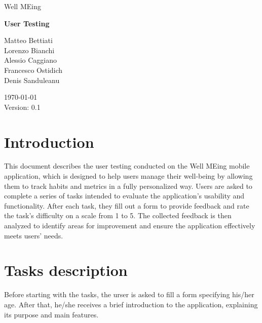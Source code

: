 \documentclass{article}
\begin{document}


\begin{center}

	\fontsize{20pt}{30pt}\selectfont
	Well MEing

	\vspace{2cm}

	\fontsize{25pt}{45pt}\selectfont
	\textbf{User Testing}

	\vfill

	\fontsize{12pt}{18pt}\selectfont
	Matteo Bettiati \\
	Lorenzo Bianchi \\
	Alessio Caggiano \\
	Francesco Ostidich \\
	Denis Sanduleanu \\

	\vspace{1cm}

	\today \\
	\vspace{12pt}
	Version: 0.1
	\normalsize

\end{center}

\newpage
{}
\tableofcontents
\newpage



\section{Introduction}
This document describes the user testing conducted on the Well MEing mobile application, which is designed to help users manage their well-being by allowing them to track habits and metrics in a fully personalized way.
Users are asked to complete a series of tasks intended to evaluate the application's usability and functionality.
After each task, they fill out a form to provide feedback and rate the task’s difficulty on a scale from 1 to 5.
The collected feedback is then analyzed to identify areas for improvement and ensure the application effectively meets users' needs.

\section{Tasks description}
Before starting with the tasks, the urser is asked to fill a form specifying his/her age.
After that, he/she receives a brief introduction to the application, explaining its purpose and main features.
\end{document}
